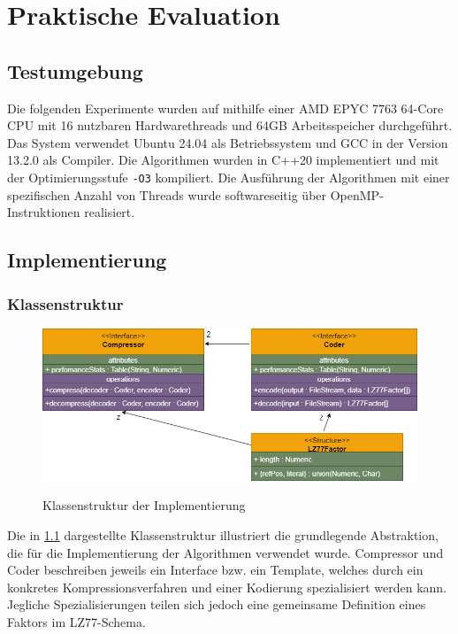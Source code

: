 \chapter{Praktische Evaluation} \label{sec:evaluation}

\section{Testumgebung}
Die folgenden Experimente wurden auf mithilfe einer AMD EPYC 7763 64-Core CPU mit 16 nutzbaren Hardwarethreads und 64GB Arbeitsspeicher durchgeführt. Das System
verwendet Ubuntu 24.04 als Betriebssystem und GCC in der Version 13.2.0 als Compiler. Die Algorithmen wurden in C++20 implementiert und mit der Optimierungsstufe
\texttt{-O3} kompiliert. Die Ausführung der Algorithmen mit einer spezifischen Anzahl von Threads wurde softwareseitig über OpenMP-Instruktionen \cite{openmp} realisiert. 

\section{Implementierung}

\subsection{Klassenstruktur}
\begin{figure}[ht]
    \centering
    \caption{Klassenstruktur der Implementierung}
    \includegraphics[scale=0.4]{Images/uml.png} \label{uml}
\end{figure}

Die in \ref{uml} dargestellte Klassenstruktur illustriert die grundlegende Abstraktion, die für die Implementierung der Algorithmen verwendet wurde. Compressor und
Coder beschreiben jeweils ein Interface bzw. ein Template, welches durch ein konkretes Kompressionsverfahren und einer Kodierung spezialisiert werden kann. Jegliche
Spezialisierungen teilen sich jedoch eine gemeinsame Definition eines Faktors im LZ77-Schema.

